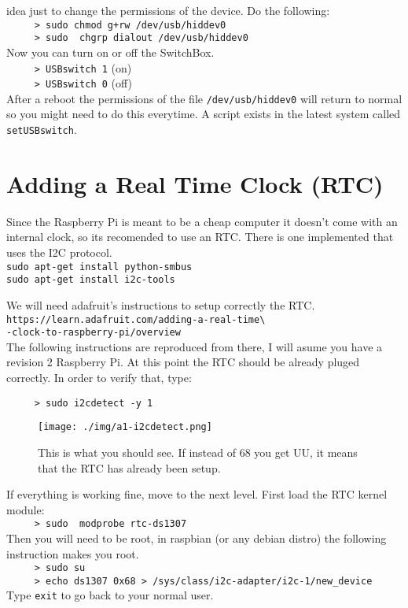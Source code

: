 \begin{enumerate}
idea just to change the permissions of the device. Do the following:\\
\verb=     > sudo chmod g+rw /dev/usb/hiddev0=\\
\verb=     > sudo  chgrp dialout /dev/usb/hiddev0=\\
Now you can turn on or off the SwitchBox.\\
\verb=     > USBswitch 1= (on)\\
\verb=     > USBswitch 0= (off)\\
After a reboot the permissions of the file \verb=/dev/usb/hiddev0= will return to normal so you might need to do this everytime. A script exists in the
latest system called \verb=setUSBswitch=.

\section{Adding a Real Time Clock (RTC)}
Since the Raspberry Pi is meant to be a cheap computer it doesn't come with an internal clock, so its recomended to use an RTC.
There is one implemented that uses the I2C protocol. \\
\verb=sudo apt-get install python-smbus=\\
\verb=sudo apt-get install i2c-tools=

We will need adafruit's instructions to setup correctly the RTC.\\
\verb=https://learn.adafruit.com/adding-a-real-time\=\\
\verb=-clock-to-raspberry-pi/overview=\\
The following instructions are reproduced from there, I will asume you have a revision 2 Raspberry Pi. At this point the RTC should be already pluged correctly.
In order to verify that, type:

\verb=     > sudo i2cdetect -y 1=

\begin{figure}
 \centering
 \texttt{[image: ./img/a1-i2cdetect.png]}
 \caption{This is what you should see. If instead of 68 you get UU, it means that the RTC has already been setup.}
 \label{fig:i2cdetect}
\end{figure}

If everything is working fine, move to the next level. First load the RTC kernel module:\\
\verb=     > sudo  modprobe rtc-ds1307=\\
Then you will need to be root, in raspbian (or any debian distro) the following instruction makes you root.\\
\verb=     > sudo su=\\
\verb=     > echo ds1307 0x68 > /sys/class/i2c-adapter/i2c-1/new_device=\\
Type \verb=exit= to go back to your normal user.


\end{enumerate}
